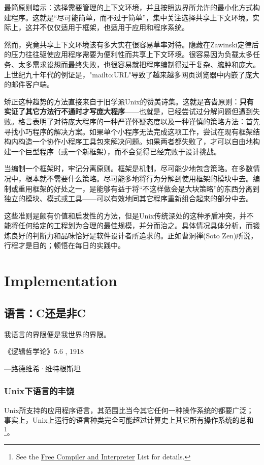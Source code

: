 \documentclass[12pt,oneside]{book}
\begin{document}
\begin{common-format}
最简原则暗示：选择需要管理的上下文环境，并且按照边界所允许的最小化方式构建程序。这就是“尽可能简单，而不过于简单”，集中关注选择共享上下文环境。实际上，这并不仅仅适用于框架，也适用于应用和程序系统。

然而，究竟共享上下文环境该有多大实在很容易草率对待。隐藏在Zawinski定律后的压力往往驱使应用程序需要为便利性而共享上下文环境。很容易因为负载太多任务、太多需求设想而最终失败，也很容易就把程序编制得过于复杂、臃肿和庞大。上世纪九十年代的例证是，"mailto:URL"导致了越来越多网页浏览器中内嵌了庞大的邮件客户端。

矫正这种趋势的方法直接来自于旧学派Unix的赞美诗集。这就是吝啬原则：\textbf{只有实证了其它方法行不通时才写庞大程序}——也就是，已经尝试过分解问题但遭到失败。格言表明了对待庞大程序的一种严谨怀疑态度以及一种谨慎的策略方法：首先寻找小巧程序的解决方案。如果单个小程序无法完成这项工作，尝试在现有框架结构内构造一个协作小程序工具包来解决问题。如果两者都失败了，才可以自由地构建一个巨型程序（或一个新框架），而不会觉得已经完败于设计挑战。

当编制一个框架时，牢记分离原则。框架是机制，尽可能少地包含策略。在多数情况中，根本就不需要什么策略。尽可能多地将行为分解到使用框架的模块中去。编制或重用框架的好处之一，是能够有益于将“不这样做会是大块策略”的东西分离到独立的模块、模式或工具——可以有效地同其它程序重新组合起来的部分中去。

这些准则是颇有价值和启发性的方法，但是Unix传统深处的这种矛盾冲突，并不能将任何给定的工程划为合理的最佳规模，并分而治之。具体情况具体分析，而锻炼良好的判断力和品味恰好是软件设计者所追求的。正如曹洞禅(Soto Zen)所说，行程才是目的；顿悟在每日的实践中。


\part{Implementation}
\chapter{语言：C还是非C}
\begin{flushright}
\begin{notecard}{15em}
我语言的界限便是我世界的界限。

{\hfill 《逻辑哲学论》5.6 , 1918}

{\hfill —路德维希·维特根斯坦}
\end{notecard}
\end{flushright}

\section{Unix下语言的丰饶}
Unix所支持的应用程序语言，其范围比当今其它任何一种操作系统的都要广泛；事实上，Unix上运行的语言种类完全可能超过计算史上其它所有操作系统的总和\footnote{See the \href{ftp://ftp.idiom.com/pub/compilers-list/free-compilers}{Free Compiler and Interpreter} List for details.}。


\end{common-format}
\end{document}
